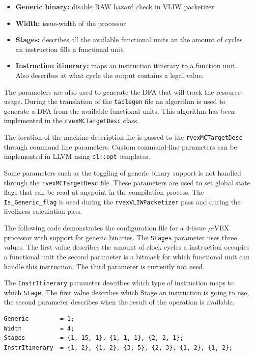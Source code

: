 \begin{itemize}
  \item \textbf{Generic binary:} disable RAW hazard check in VLIW packetizer
  \item \textbf{Width:} issue-width of the processor
  \item \textbf{Stages:} describes all the available functional units an the amount of cycles an instruction fills a functional unit.
  \item \textbf{Instruction itinerary:} maps an instruction itinerary to a function unit. Also describes at what cycle the output contains a legal value.
\end{itemize}

The parameters are also used to generate the DFA that will track the resource usage. During the translation of the \texttt{tablegen} file an algorithm is used to generate a DFA from the available functional units. This algorithm has been implemented in the \texttt{rvexMCTargetDesc} class.

The location of the machine description file is passed to the \texttt{rvexMCTargetDesc} through command line parameters. Custom command-line parameters can be implemented in LLVM using \texttt{cl::opt} templates.

Some parameters such as the toggling of generic binary support is not handled through the \texttt{rvexMCTargetDesc} file. These parameters are used to set global state flags that can be read at anypoint in the compilation process. The \texttt{Is\_Generic\_flag} is used during the \texttt{rvexVLIWPacketizer} pass and during the liveliness calculation pass.

The following code demonstrates the configuration file for a 4-issue $\rho$-VEX processor with support for generic binaries. The \texttt{Stages} parameter uses three values. The first value describes the amount of clock cycles a instruction occupies a functional unit the second parameter is a bitmask for which functional unit can handle this instruction. The third parameter is currently not used.

The \texttt{InstrItinerary} parameter describes which type of instruction maps to which \texttt{Stage}. The first value describes which Stage an instruction is going to use, the second parameter describes when the result of the operation is available.

\begin{lstlisting}[language=config]
Generic         = 1;
Width           = 4; 
Stages          = {1, 15, 1}, {1, 1, 1}, {2, 2, 1};
InstrItinerary  = {1, 2}, {1, 2}, {3, 5}, {2, 3}, {1, 2}, {1, 2};
\end{lstlisting}

